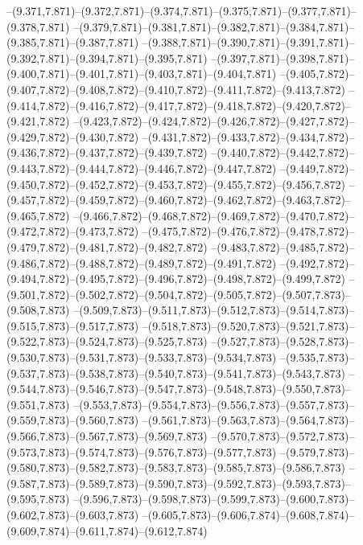   --(9.371,7.871)--(9.372,7.871)--(9.374,7.871)--(9.375,7.871)--(9.377,7.871)--(9.378,7.871)%
  --(9.379,7.871)--(9.381,7.871)--(9.382,7.871)--(9.384,7.871)--(9.385,7.871)--(9.387,7.871)%
  --(9.388,7.871)--(9.390,7.871)--(9.391,7.871)--(9.392,7.871)--(9.394,7.871)--(9.395,7.871)%
  --(9.397,7.871)--(9.398,7.871)--(9.400,7.871)--(9.401,7.871)--(9.403,7.871)--(9.404,7.871)%
  --(9.405,7.872)--(9.407,7.872)--(9.408,7.872)--(9.410,7.872)--(9.411,7.872)--(9.413,7.872)%
  --(9.414,7.872)--(9.416,7.872)--(9.417,7.872)--(9.418,7.872)--(9.420,7.872)--(9.421,7.872)%
  --(9.423,7.872)--(9.424,7.872)--(9.426,7.872)--(9.427,7.872)--(9.429,7.872)--(9.430,7.872)%
  --(9.431,7.872)--(9.433,7.872)--(9.434,7.872)--(9.436,7.872)--(9.437,7.872)--(9.439,7.872)%
  --(9.440,7.872)--(9.442,7.872)--(9.443,7.872)--(9.444,7.872)--(9.446,7.872)--(9.447,7.872)%
  --(9.449,7.872)--(9.450,7.872)--(9.452,7.872)--(9.453,7.872)--(9.455,7.872)--(9.456,7.872)%
  --(9.457,7.872)--(9.459,7.872)--(9.460,7.872)--(9.462,7.872)--(9.463,7.872)--(9.465,7.872)%
  --(9.466,7.872)--(9.468,7.872)--(9.469,7.872)--(9.470,7.872)--(9.472,7.872)--(9.473,7.872)%
  --(9.475,7.872)--(9.476,7.872)--(9.478,7.872)--(9.479,7.872)--(9.481,7.872)--(9.482,7.872)%
  --(9.483,7.872)--(9.485,7.872)--(9.486,7.872)--(9.488,7.872)--(9.489,7.872)--(9.491,7.872)%
  --(9.492,7.872)--(9.494,7.872)--(9.495,7.872)--(9.496,7.872)--(9.498,7.872)--(9.499,7.872)%
  --(9.501,7.872)--(9.502,7.872)--(9.504,7.872)--(9.505,7.872)--(9.507,7.873)--(9.508,7.873)%
  --(9.509,7.873)--(9.511,7.873)--(9.512,7.873)--(9.514,7.873)--(9.515,7.873)--(9.517,7.873)%
  --(9.518,7.873)--(9.520,7.873)--(9.521,7.873)--(9.522,7.873)--(9.524,7.873)--(9.525,7.873)%
  --(9.527,7.873)--(9.528,7.873)--(9.530,7.873)--(9.531,7.873)--(9.533,7.873)--(9.534,7.873)%
  --(9.535,7.873)--(9.537,7.873)--(9.538,7.873)--(9.540,7.873)--(9.541,7.873)--(9.543,7.873)%
  --(9.544,7.873)--(9.546,7.873)--(9.547,7.873)--(9.548,7.873)--(9.550,7.873)--(9.551,7.873)%
  --(9.553,7.873)--(9.554,7.873)--(9.556,7.873)--(9.557,7.873)--(9.559,7.873)--(9.560,7.873)%
  --(9.561,7.873)--(9.563,7.873)--(9.564,7.873)--(9.566,7.873)--(9.567,7.873)--(9.569,7.873)%
  --(9.570,7.873)--(9.572,7.873)--(9.573,7.873)--(9.574,7.873)--(9.576,7.873)--(9.577,7.873)%
  --(9.579,7.873)--(9.580,7.873)--(9.582,7.873)--(9.583,7.873)--(9.585,7.873)--(9.586,7.873)%
  --(9.587,7.873)--(9.589,7.873)--(9.590,7.873)--(9.592,7.873)--(9.593,7.873)--(9.595,7.873)%
  --(9.596,7.873)--(9.598,7.873)--(9.599,7.873)--(9.600,7.873)--(9.602,7.873)--(9.603,7.873)%
  --(9.605,7.873)--(9.606,7.874)--(9.608,7.874)--(9.609,7.874)--(9.611,7.874)--(9.612,7.874)%
